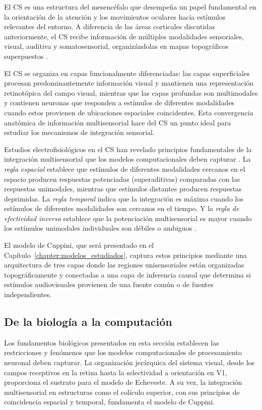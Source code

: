 El \acrfull{CS} es una estructura del mesencéfalo que desempeña un papel fundamental en la orientación de la atención y los movimientos oculares hacia estímulos relevantes del entorno. A diferencia de las áreas corticales discutidas anteriormente, el \acrshort{CS} recibe información de múltiples modalidades sensoriales, visual, auditiva y somatosensorial, organizándolas en mapas topográficos superpuestos \citep{stein2012new}.

El \acrshort{CS} se organiza en capas funcionalmente diferenciadas: las capas superficiales procesan predominantemente información visual y mantienen una representación retinotópica del campo visual, mientras que las capas profundas son multimodales y contienen neuronas que responden a estímulos de diferentes modalidades cuando estos provienen de ubicaciones espaciales coincidentes. Esta convergencia anatómica de información multisensorial hace del \acrshort{CS} un punto ideal para estudiar los mecanismos de integración sensorial.

Estudios electrofisiológicos en el \acrshort{CS} han revelado principios fundamentales de la integración multisensorial que los modelos computacionales deben capturar \citep{stein2012new, paredes2025scikit}. La \textit{regla espacial} establece que estímulos de diferentes modalidades cercanos en el espacio producen respuestas potenciadas (superaditivas) comparadas con las respuestas unimodales, mientras que estímulos distantes producen respuestas deprimidas. La \textit{regla temporal} indica que la integración es máxima cuando los estímulos de diferentes modalidades son cercanos en el tiempo. Y la \textit{regla de efectividad inversa} establece que la potenciación multisensorial es mayor cuando los estímulos unimodales individuales son débiles o ambiguos \citep{cuppini2017biologically}.

El modelo de Cuppini, que será presentado en el Capítulo~\ref{chapter:modelos_estudiados}, captura estos principios mediante una arquitectura de tres capas donde las regiones unisensoriales están organizadas topográficamente y conectadas a una capa de inferencia causal que determina si estímulos audiovisuales provienen de una fuente común o de fuentes independientes.

\subsection{De la biología a la computación}
\label{subsec:sintesis_biologia}

Los fundamentos biológicos presentados en esta sección establecen las restricciones y fenómenos que los modelos computacionales de procesamiento neuronal deben capturar. La organización jerárquica del sistema visual, desde los campos receptivos en la retina hasta la selectividad a orientación en V1, proporciona el sustrato para el modelo de Echeveste. A su vez, la integración multisensorial en estructuras como el colículo superior, con sus principios de coincidencia espacial y temporal, fundamenta el modelo de Cuppini.

